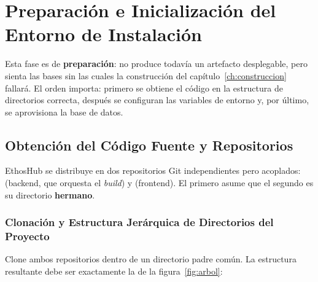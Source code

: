 \chapter[Preparación e Inicialización]{Preparación e Inicialización del Entorno de Instalación}%
\label{ch:preparacion}

Esta fase es de \textbf{preparación}: no produce todavía un artefacto desplegable, pero
sienta las bases sin las cuales la construcción del capítulo~\ref{ch:construccion}
fallará. El orden importa: primero se obtiene el código en la estructura de directorios
correcta, después se configuran las variables de entorno y, por último, se aprovisiona la
base de datos.\par

\section{Obtención del Código Fuente y Repositorios}%
\label{sec:codigo}

EthosHub se distribuye en dos repositorios Git independientes pero acoplados:
 (backend, que orquesta el \textit{build}) y 
(frontend). El primero asume que el segundo es su directorio \textbf{hermano}.\par

\subsection[Clonación y Estructura de Directorios]{Clonación y Estructura Jerárquica de Directorios del Proyecto}%
\label{sec:clonado}

Clone ambos repositorios dentro de un directorio padre común. La estructura resultante
debe ser exactamente la de la figura~\ref{fig:arbol}:\par

